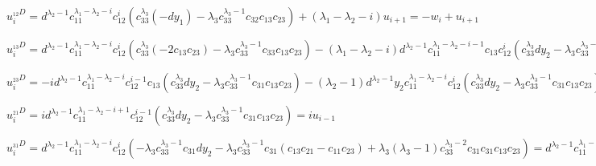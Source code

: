%
%
$ u_i^{_{12}D} = d^{\lambda_2 - 1} c_{11}^{\lambda_1 - \lambda_2 - i} c_{12}^i (c_{33}^{\lambda_3} (- d y_1) - \lambda_3 c_{33}^{\lambda_3 - 1} c_{32}c_{13}c_{23}) + (\lambda_1 - \lambda_2 - i) u_{i + 1} = - w_i + u_{i + 1} $
\newline

%
%
$ u_i^{_{13}D} = d^{\lambda_2 - 1} c_{11}^{\lambda_1 - \lambda_2 - i} c_{12}^i (c_{33}^{\lambda_3} (-2 c_{13}c_{23}) - \lambda_3 c_{33}^{\lambda_3 - 1} c_{33}c_{13}c_{23}) - (\lambda_1 - \lambda_2 - i) d^{\lambda_2 - 1} c_{11}^{\lambda_1 - \lambda_2 - i - 1} c_{13} c_{12}^i (c_{33}^{\lambda_3} d y_2 - \lambda_3 c_{33}^{\lambda_3 - 1} c_{31}c_{13}c_{23}) - (\lambda_2 - 1) d^{\lambda_2 - 1} y_1 c_{11}^{\lambda_1 - \lambda_2 - i} c_{12}^i (c_{33}^{\lambda_3} d y_2 - \lambda_3 c_{33}^{\lambda_3 - 1} c_{31}c_{13}c_{23}) = d^{\lambda_2 - 1} c_{11}^{\lambda_1 - \lambda_2 - i} c_{12}^i (-2 c_{33}^{\lambda_3} c_{13}c_{23} - \lambda_3 c_{33}^{\lambda_3} c_{13}c_{23}) - (\lambda_1 - \lambda_2 - i) d^{\lambda_2 - 1} c_{11}^{\lambda_1 - \lambda_2 - i - 1} c_{12}^i c_{33}^{\lambda_3} c_{13} d y_2 - (\lambda_2 - 1) d^{\lambda_2 - 1} c_{11}^{\lambda_1 - \lambda_2 - i} c_{12}^i c_{33}^{\lambda_3} d y_1 y_2 = -(\lambda_3 + 2) r_i - (\lambda_1 - \lambda_2 - i) r_i - (\lambda_2 - 1) r_i = (i - \lambda_1 - \lambda_3 - 1) r_i $
\newline

%
%
$ u_i^{_{23}D} = -i d^{\lambda_2 - 1} c_{11}^{\lambda_1 - \lambda_2 - i} c_{12}^{i - 1} c_{13} (c_{33}^{\lambda_3} d y_2 - \lambda_3 c_{33}^{\lambda_3 - 1} c_{31}c_{13}c_{23}) - (\lambda_2 - 1) d^{\lambda_2 - 1} y_2 c_{11}^{\lambda_1 - \lambda_2 - i} c_{12}^i (c_{33}^{\lambda_3} d y_2 - \lambda_3 c_{33}^{\lambda_3 - 1} c_{31}c_{13}c_{23}) = -i d^{\lambda_2 - 1} c_{11}^{\lambda_1 - \lambda_2 - i} c_{12}^{i - 1} c_{33}^{\lambda_3} c_{13} d y_2 = -i r_{i - 1} $
\newline

%
%
$ u_i^{_{21}D} = i d^{\lambda_2 - 1} c_{11}^{\lambda_1 - \lambda_2 - i + 1} c_{12}^{i - 1} (c_{33}^{\lambda_3} d y_2 - \lambda_3 c_{33}^{\lambda_3 - 1} c_{31}c_{13}c_{23}) = i u_{i - 1} $
\newline

%
%
$ u_i^{_{31}D} = d^{\lambda_2 - 1} c_{11}^{\lambda_1 - \lambda_2 - i} c_{12}^i (- \lambda_3 c_{33}^{\lambda_3 - 1} c_{31} d y_2 - \lambda_3 c_{33}^{\lambda_3 - 1} c_{31}(c_{13}c_{21} - c_{11}c_{23}) + \lambda_3 (\lambda_3 - 1) c_{33}^{\lambda_3 - 2} c_{31}c_{31}c_{13}c_{23}) = d^{\lambda_2 - 1} c_{11}^{\lambda_1 - \lambda_2 - i} c_{12}^i (- \lambda_3 c_{33}^{\lambda_3 - 1} c_{31} d y_2 - \lambda_3 c_{33}^{\lambda_3 - 1} c_{31} (-d y_2)) = 0 $
\newline


